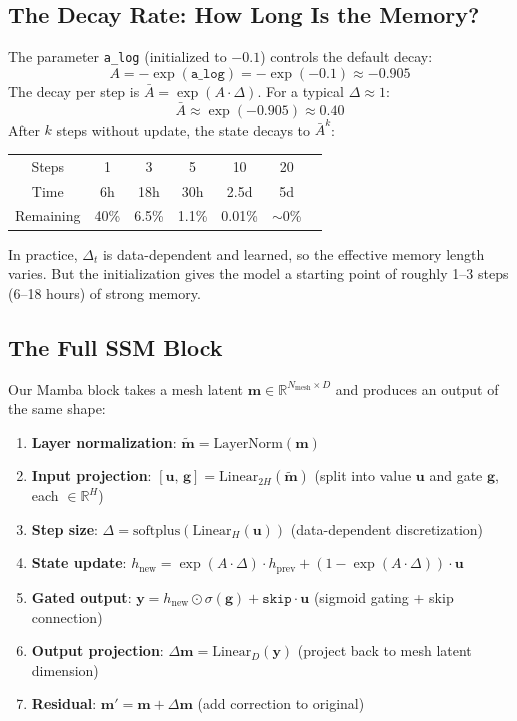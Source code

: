 \documentclass[11pt,a4paper]{article}
\begin{document}
\subsection{The Decay Rate: How Long Is the Memory?}

The parameter \texttt{a\_log} (initialized to $-0.1$) controls the default decay:
\[
A = -\exp(\texttt{a\_log}) = -\exp(-0.1) \approx -0.905
\]
The decay per step is $\bar{A} = \exp(A \cdot \Delta)$. For a typical $\Delta \approx 1$:
\[
\bar{A} \approx \exp(-0.905) \approx 0.40
\]
After $k$ steps without update, the state decays to $\bar{A}^k$:

\begin{center}
\begin{tabular}{ccccccc}
\toprule
Steps & 1 & 3 & 5 & 10 & 20 \\
Time & 6h & 18h & 30h & 2.5d & 5d \\
Remaining & 40\% & 6.5\% & 1.1\% & 0.01\% & $\sim$0\% \\
\bottomrule
\end{tabular}
\end{center}

In practice, $\Delta_t$ is data-dependent and learned, so the effective memory length varies. But the initialization gives the model a starting point of roughly 1--3 steps (6--18 hours) of strong memory.

\subsection{The Full SSM Block}

Our Mamba block takes a mesh latent $\mathbf{m} \in \mathbb{R}^{N_\text{mesh} \times D}$ and produces an output of the same shape:

\begin{enumerate}[nosep]
  \item \textbf{Layer normalization}: $\tilde{\mathbf{m}} = \text{LayerNorm}(\mathbf{m})$
  \item \textbf{Input projection}: $[\mathbf{u},\, \mathbf{g}] = \text{Linear}_{2H}(\tilde{\mathbf{m}})$ \quad (split into value $\mathbf{u}$ and gate $\mathbf{g}$, each $\in \mathbb{R}^H$)
  \item \textbf{Step size}: $\Delta = \text{softplus}(\text{Linear}_H(\mathbf{u}))$ \quad (data-dependent discretization)
  \item \textbf{State update}: $h_\text{new} = \exp(A \cdot \Delta) \cdot h_\text{prev} + (1 - \exp(A \cdot \Delta)) \cdot \mathbf{u}$
  \item \textbf{Gated output}: $\mathbf{y} = h_\text{new} \odot \sigma(\mathbf{g}) + \texttt{skip} \cdot \mathbf{u}$ \quad (sigmoid gating + skip connection)
  \item \textbf{Output projection}: $\Delta\mathbf{m} = \text{Linear}_D(\mathbf{y})$ \quad (project back to mesh latent dimension)
  \item \textbf{Residual}: $\mathbf{m}' = \mathbf{m} + \Delta\mathbf{m}$ \quad (add correction to original)
\end{enumerate}
\end{document}
